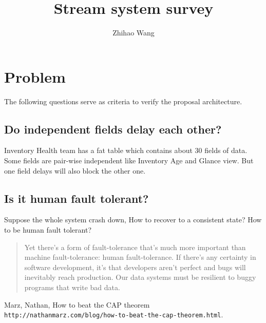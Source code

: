 \documentclass[12pt]{article}
\title{Stream system survey}
\author{Zhihao Wang}
\begin{document}
\maketitle

\section{Problem}
The following questions serve as criteria to verify the proposal architecture.

\subsection{Do independent fields delay each other?}
Inventory Health team has a fat table which contains about 30 fields of data. Some fields are pair-wise independent like Inventory Age and Glance view. But one field delays will also block the other one.

\subsection{Is it human fault tolerant?}
Suppose the whole system crash down, How to recover to a consistent state? How to be human fault tolerant?
\begin{quote}
Yet there's a form of fault-tolerance that's much more important than machine fault-tolerance: human fault-tolerance. If there's any certainty in software development, it's that developers aren't perfect and bugs will inevitably reach production. Our data systems must be resilient to buggy programs that write bad data. \cite{latexcompanion}
\end{quote}

\begin{thebibliography}{9}
     Marz, Nathan, How to beat the CAP theorem \texttt{http://nathanmarz.com/blog/how-to-beat-the-cap-theorem.html}.
\end{thebibliography}
\end{document}
